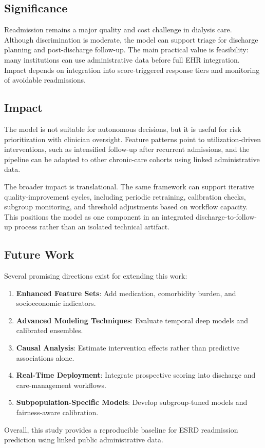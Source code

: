 \documentclass[conference]{IEEEtran}
\begin{document}
\subsection{Significance}
Readmission remains a major quality and cost challenge in dialysis care. Although discrimination is moderate, the model can support triage for discharge planning and post-discharge follow-up. The main practical value is feasibility: many institutions can use administrative data before full EHR integration. Impact depends on integration into score-triggered response tiers and monitoring of avoidable readmissions.

\subsection{Impact}
The model is not suitable for autonomous decisions, but it is useful for risk prioritization with clinician oversight. Feature patterns point to utilization-driven interventions, such as intensified follow-up after recurrent admissions, and the pipeline can be adapted to other chronic-care cohorts using linked administrative data.

The broader impact is translational. The same framework can support iterative quality-improvement cycles, including periodic retraining, calibration checks, subgroup monitoring, and threshold adjustments based on workflow capacity. This positions the model as one component in an integrated discharge-to-follow-up process rather than an isolated technical artifact.

\subsection{Future Work}
Several promising directions exist for extending this work:

\begin{enumerate}
    \item \textbf{Enhanced Feature Sets}: Add medication, comorbidity burden, and socioeconomic indicators.
    
    \item \textbf{Advanced Modeling Techniques}: Evaluate temporal deep models and calibrated ensembles.
    
    \item \textbf{Causal Analysis}: Estimate intervention effects rather than predictive associations alone.
    
    \item \textbf{Real-Time Deployment}: Integrate prospective scoring into discharge and care-management workflows.
    
    \item \textbf{Subpopulation-Specific Models}: Develop subgroup-tuned models and fairness-aware calibration.
\end{enumerate}

Overall, this study provides a reproducible baseline for ESRD readmission prediction using linked public administrative data.



\end{document}
